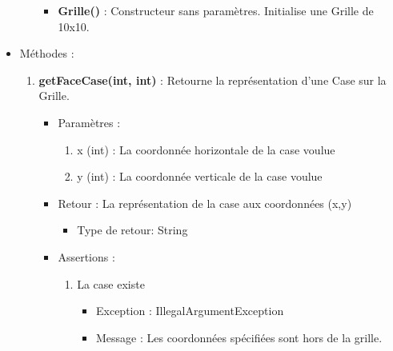 \begin{itemize}
\begin{enumerate}
\begin{itemize}
    \item {\bf Grille() }: Constructeur sans paramètres. Initialise une Grille de 10x10.
    \end{itemize}
    
  \end{enumerate}

  \item Méthodes : 

    \begin{enumerate}
      
    \item {\bf getFaceCase(int, int) }: Retourne la représentation d'une Case sur la Grille.
      \begin{itemize}
      \item Paramètres : 
        \begin{enumerate}
        \item x (int) : La coordonnée horizontale de la case voulue
        \item y (int) : La coordonnée verticale de la case voulue          
        \end{enumerate}
      \item Retour : La représentation de la case aux coordonnées (x,y)
          \begin{itemize}
          \item Type de retour: String
          \end{itemize}
      \item Assertions : 
        \begin{enumerate}
        \item La case existe
          \begin{itemize}
            \item Exception : IllegalArgumentException
          \item Message : Les coordonnées spécifiées sont hors de la grille.
          \end{itemize}
        \end{enumerate}
      \end{itemize}
      

\end{enumerate}
\end{itemize}
